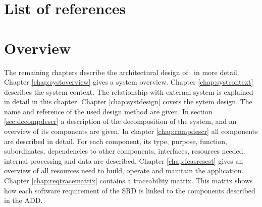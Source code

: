 \section{List of references}


\section{Overview}
The remaining chapters describe the architectural design of \projectname\ in more detail. Chapter \ref{chap:systoverview} gives a system overview. Chapter \ref{chap:systcontext} describes the system context. The relationship with external system is explained in detail in this chapter. Chapter \ref{chap:systdesign} covers the sytem design. The name and reference of the used design method are given. In section \ref{sec:decompdescr} a description of the decomposition of the system, and an overview of its components are given.
In chapter \ref{chap:compdescr} all components are described in detail. For each component, its type, purpose, function, subordinates, dependencies to other components, interfaces, resources needed, internal processing and  data are described. Chapter \ref{chap:feasresest} gives an overview of all resources need to build, operate and maintain the application. Chapter \ref{chap:reqtracematrix} contains a traceability matrix. This matrix shows how each software requirement of the SRD \cite{srd} is linked to the components described in the ADD.


